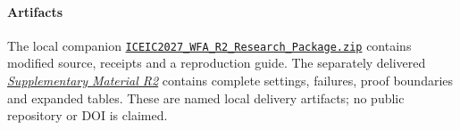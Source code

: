 \documentclass[conference,a4paper]{IEEEtran}
\begin{document}
\paragraph{Artifacts} The local companion \href{ICEIC2027_WFA_R2_Research_Package.zip}{\nolinkurl{ICEIC2027_WFA_R2_Research_Package.zip}} contains modified source, receipts and a reproduction guide. The separately delivered \href{Supplementary_Material_R2.pdf}{\emph{Supplementary Material R2}} contains complete settings, failures, proof boundaries and expanded tables. These are named local delivery artifacts; no public repository or DOI is claimed.

\end{document}
